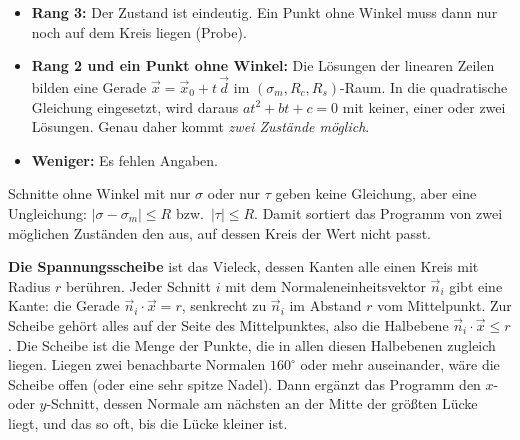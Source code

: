\begin{itemize}
  \item \textbf{Rang 3:} Der Zustand ist eindeutig. Ein Punkt ohne Winkel muss dann nur noch auf
        dem Kreis liegen (Probe).
  \item \textbf{Rang 2 und ein Punkt ohne Winkel:} Die Lösungen der linearen Zeilen bilden eine
        Gerade $\vec x = \vec x_0 + t\,\vec d$ im $(\sigma_m, R_c, R_s)$-Raum. In die quadratische
        Gleichung eingesetzt, wird daraus $a t^2 + b t + c = 0$ mit keiner, einer oder zwei Lösungen.
        Genau daher kommt \emph{zwei Zustände möglich}.
  \item \textbf{Weniger:} Es fehlen Angaben.
\end{itemize}

Schnitte ohne Winkel mit nur $\sigma$ oder nur $\tau$ geben keine Gleichung, aber eine
Ungleichung: $|\sigma - \sigma_m| \le R$ bzw.\ $|\tau| \le R$. Damit sortiert das Programm von zwei
möglichen Zuständen den aus, auf dessen Kreis der Wert nicht passt.

\textbf{Die Spannungsscheibe} ist das Vieleck, dessen Kanten alle einen Kreis mit Radius $r$
berühren. Jeder Schnitt $i$ mit dem Normaleneinheitsvektor $\vec n_i$ gibt eine Kante: die Gerade
$\vec n_i \cdot \vec x = r$, senkrecht zu $\vec n_i$ im Abstand $r$ vom Mittelpunkt. Zur Scheibe
gehört alles auf der Seite des Mittelpunktes, also die Halbebene $\vec n_i \cdot \vec x \le r$. Die
Scheibe ist die Menge der Punkte, die in allen diesen Halbebenen zugleich liegen. Liegen zwei
benachbarte Normalen $160^\circ$ oder mehr auseinander, wäre die Scheibe
offen (oder eine sehr spitze Nadel). Dann ergänzt das Programm den $x$- oder $y$-Schnitt, dessen
Normale am nächsten an der Mitte der größten Lücke liegt, und das so oft, bis die Lücke kleiner ist.
